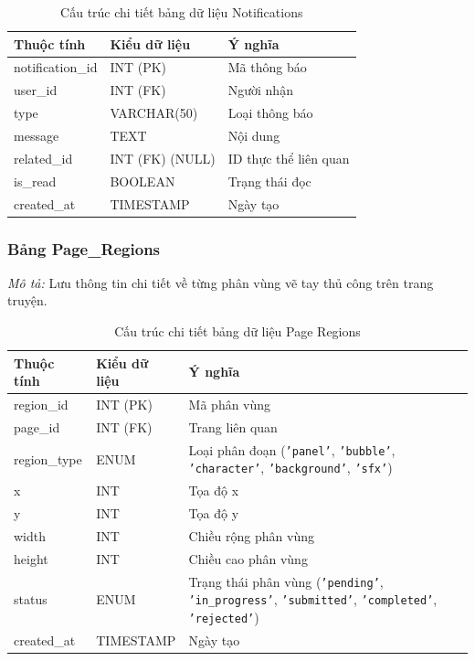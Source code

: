 \noindent
\begin{table}[H]
\centering
\renewcommand{\arraystretch}{1.3}
\begin{tabularx}{\textwidth}{|p{4cm}|p{3cm}|>{\raggedright\arraybackslash}X|}
\hline
\rowcolor{tableheader}
\textbf{Thuộc tính} & \textbf{Kiểu dữ liệu} & \textbf{Ý nghĩa} \\ \hline
notification\_id & INT (PK) & Mã thông báo \\ \hline
user\_id & INT (FK) & Người nhận \\ \hline
type & VARCHAR(50) & Loại thông báo \\ \hline
message & TEXT & Nội dung \\ \hline
related\_id & INT (FK) (NULL) & ID thực thể liên quan \\ \hline
is\_read & BOOLEAN & Trạng thái đọc \\ \hline
created\_at & TIMESTAMP & Ngày tạo \\ \hline
\end{tabularx}
\caption{Cấu trúc chi tiết bảng dữ liệu Notifications}
\label{tab:db_notifications}
\end{table}
\vspace{0.5cm}

\subsubsection{Bảng Page\_Regions}
\label{subsubsec:tbl_page_regions}
\textit{Mô tả:} Lưu thông tin chi tiết về từng phân vùng vẽ tay thủ công trên trang truyện.

\noindent
\begin{table}[H]
\centering
\renewcommand{\arraystretch}{1.3}
\begin{tabularx}{\textwidth}{|p{4cm}|p{3cm}|>{\raggedright\arraybackslash}X|}
\hline
\rowcolor{tableheader}
\textbf{Thuộc tính} & \textbf{Kiểu dữ liệu} & \textbf{Ý nghĩa} \\ \hline
region\_id & INT (PK) & Mã phân vùng \\ \hline
page\_id & INT (FK) & Trang liên quan \\ \hline
region\_type & ENUM & Loại phân đoạn (\texttt{'panel'}, \texttt{'bubble'}, \texttt{'character'}, \texttt{'background'}, \texttt{'sfx'}) \\ \hline
x & INT & Tọa độ x \\ \hline
y & INT & Tọa độ y \\ \hline
width & INT & Chiều rộng phân vùng \\ \hline
height & INT & Chiều cao phân vùng \\ \hline
status & ENUM & Trạng thái phân vùng (\texttt{'pending'}, \texttt{'in\_progress'}, \texttt{'submitted'}, \texttt{'completed'}, \texttt{'rejected'}) \\ \hline
created\_at & TIMESTAMP & Ngày tạo \\ \hline
\end{tabularx}
\caption{Cấu trúc chi tiết bảng dữ liệu Page Regions}
\label{tab:db_page_regions}
\end{table}
\vspace{0.5cm}

